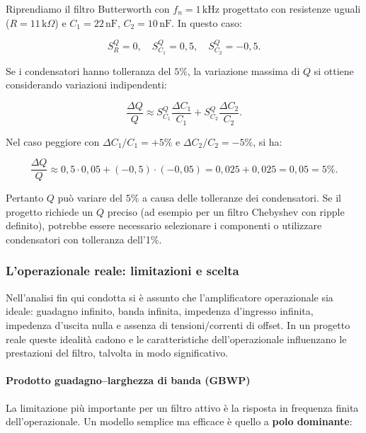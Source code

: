Riprendiamo il filtro Butterworth con \(f_n = 1\,\text{kHz}\) progettato con resistenze uguali (\(R=11\,\text{k}\Omega\)) e \(C_1 = 22\,\text{nF}\), \(C_2 = 10\,\text{nF}\). In questo caso:

\begin{equation}
S_{R}^{Q}=0,\quad S_{C_1}^{Q}=0,5,\quad S_{C_2}^{Q}=-0,5.
\label{eq:esempio_sensibilita}
\end{equation}

Se i condensatori hanno tolleranza del \(5\%\), la variazione massima di \(Q\) si ottiene considerando variazioni indipendenti:

\begin{equation}
\frac{\Delta Q}{Q} \approx S_{C_1}^{Q} \frac{\Delta C_1}{C_1} + S_{C_2}^{Q} \frac{\Delta C_2}{C_2}.
\label{eq:variazione_Q}
\end{equation}

Nel caso peggiore con \(\Delta C_1/C_1 = +5\%\) e \(\Delta C_2/C_2 = -5\%\), si ha:

\begin{equation}
\frac{\Delta Q}{Q} \approx 0,5 \cdot 0,05 + (-0,5) \cdot (-0,05) = 0,025 + 0,025 = 0,05 = 5\%.
\label{eq:calcolo_esempio}
\end{equation}

Pertanto \(Q\) può variare del \(5\%\) a causa delle tolleranze dei condensatori. Se il progetto richiede un \(Q\) preciso (ad esempio per un filtro Chebyshev con ripple definito), potrebbe essere necessario selezionare i componenti o utilizzare condensatori con tolleranza dell'1\%.


\subsubsection{L'operazionale reale: limitazioni e scelta}

Nell'analisi fin qui condotta si è assunto che l'amplificatore operazionale sia ideale: guadagno infinito, banda infinita, impedenza d'ingresso infinita, impedenza d'uscita nulla e assenza di tensioni/correnti di offset. In un progetto reale queste idealità cadono e le caratteristiche dell'operazionale influenzano le prestazioni del filtro, talvolta in modo significativo.

\paragraph{Prodotto guadagno–larghezza di banda (GBWP)}
La limitazione più importante per un filtro attivo è la risposta in frequenza finita dell'operazionale. Un modello semplice ma efficace è quello a \textbf{polo dominante}:

